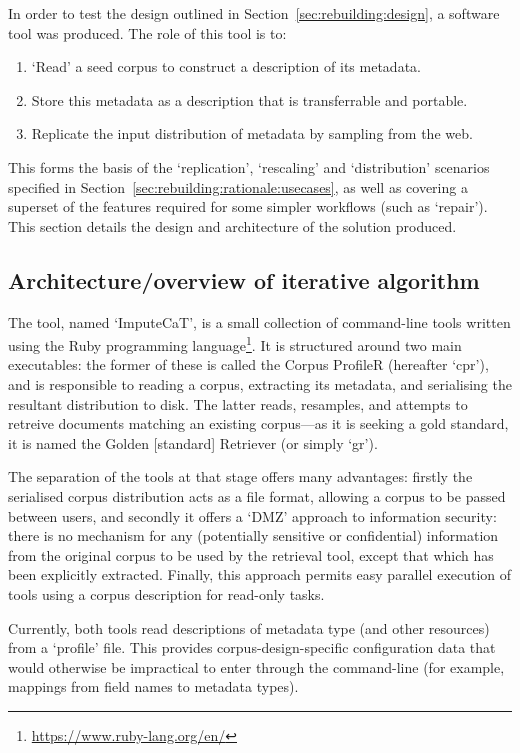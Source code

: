 In order to test the design outlined in Section~\ref{sec:rebuilding:design}, a software tool was produced.  The role of this tool is to:

\begin{enumerate}
    \item `Read' a seed corpus to construct a description of its metadata.
    \item Store this metadata as a description that is transferrable and portable.
    \item Replicate the input distribution of metadata by sampling from the web.
\end{enumerate}

This forms the basis of the `replication', `rescaling' and `distribution' scenarios specified in Section~\ref{sec:rebuilding:rationale:usecases}, as well as covering a superset of the features required for some simpler workflows (such as `repair').  This section details the design and architecture of the solution produced.


\subsection{Architecture/overview of iterative algorithm}
The tool, named `ImputeCaT', is a small collection of command-line tools written using the Ruby programming language\footnote{\url{https://www.ruby-lang.org/en/}}. It is structured around two main executables: the former of these is called the Corpus ProfileR (hereafter `cpr'), and is responsible to reading a corpus, extracting its metadata, and serialising the resultant distribution to disk.  The latter reads, resamples, and attempts to retreive documents matching an existing corpus---as it is seeking a gold standard, it is named the Golden [standard] Retriever (or simply `gr').

The separation of the tools at that stage offers many advantages: firstly the serialised corpus distribution acts as a file format, allowing a corpus to be passed between users, and secondly it offers a `DMZ' approach to information security: there is no mechanism for any (potentially sensitive or confidential) information from the original corpus to be used by the retrieval tool, except that which has been explicitly extracted.  Finally, this approach permits easy parallel execution of tools using a corpus description for read-only tasks.


Currently, both tools read descriptions of metadata type (and other resources) from a `profile' file.  This provides corpus-design-specific configuration data that would otherwise be impractical to enter through the command-line (for example, mappings from field names to metadata types).




